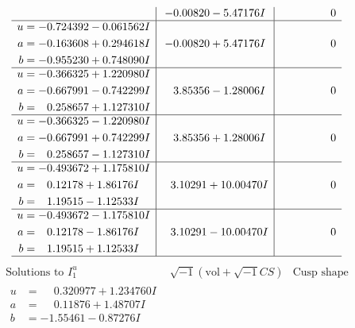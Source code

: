 \documentclass[1p]{elsarticle_modified}
\theoremstyle{definition}
\newcommand{\I}{\sqrt{-1}}
\begin{document}
$$\begin{array}{c|c|c}
 & -0.00820 - 5.47176 I & \phantom{-0.000000 } 0 \\ \hline\begin{aligned}
u &= -0.724392 - 0.061562 I \\
a &= -0.163608 + 0.294618 I \\
b &= -0.955230 + 0.748090 I\end{aligned}
 & -0.00820 + 5.47176 I & \phantom{-0.000000 } 0 \\ \hline\begin{aligned}
u &= -0.366325 + 1.220980 I \\
a &= -0.667991 - 0.742299 I \\
b &= \phantom{-}0.258657 + 1.127310 I\end{aligned}
 & \phantom{-}3.85356 - 1.28006 I & \phantom{-0.000000 } 0 \\ \hline\begin{aligned}
u &= -0.366325 - 1.220980 I \\
a &= -0.667991 + 0.742299 I \\
b &= \phantom{-}0.258657 - 1.127310 I\end{aligned}
 & \phantom{-}3.85356 + 1.28006 I & \phantom{-0.000000 } 0 \\ \hline\begin{aligned}
u &= -0.493672 + 1.175810 I \\
a &= \phantom{-}0.12178 + 1.86176 I \\
b &= \phantom{-}1.19515 - 1.12533 I\end{aligned}
 & \phantom{-}3.10291 + 10.00470 I & \phantom{-0.000000 } 0 \\ \hline\begin{aligned}
u &= -0.493672 - 1.175810 I \\
a &= \phantom{-}0.12178 - 1.86176 I \\
b &= \phantom{-}1.19515 + 1.12533 I\end{aligned}
 & \phantom{-}3.10291 - 10.00470 I & \phantom{-0.000000 } 0\\
 \hline 
 \end{array}$$\newpage$$\begin{array}{c|c|c}  
\text{Solutions to }I^u_{1}& \I (\text{vol} + \sqrt{-1}CS) & \text{Cusp shape}\\
 \hline 
\begin{aligned}
u &= \phantom{-}0.320977 + 1.234760 I \\
a &= \phantom{-}0.11876 + 1.48707 I \\
b &= -1.55461 - 0.87276 I\end{aligned}

\end{array}$$
\end{document}
